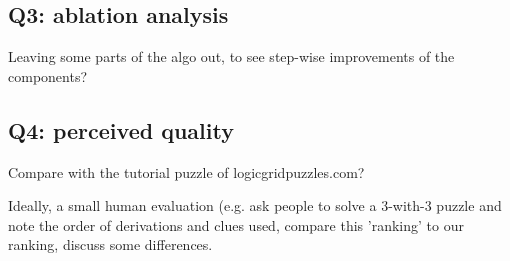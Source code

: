 \documentclass{ecai}
\begin{document}
\subsection{Q3: ablation analysis}
Leaving some parts of the algo out, to see step-wise improvements of the components?

\subsection{Q4: perceived quality}
Compare with the tutorial puzzle of logicgridpuzzles.com?

Ideally, a small human evaluation (e.g. ask people to solve a 3-with-3 puzzle and note the order of derivations and clues used, compare this 'ranking' to our ranking, discuss some differences.




\end{document}
